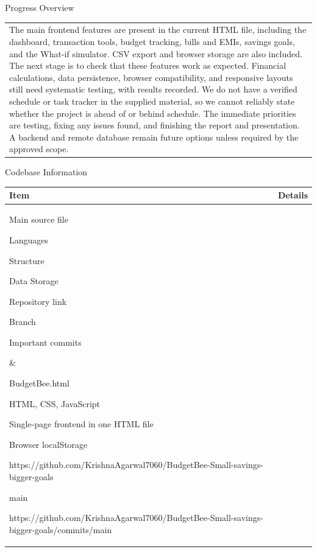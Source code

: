 \documentclass[12pt,a4paper]{article}
\newcommand{\sectiontitle}[1]{%
    {\color{GEUBlue}
    \fontsize{18}{22}\selectfont #1}
}
\newcommand{\answerbox}[2]{%
    \begin{tabularx}{\textwidth}{
        |>{\raggedright\arraybackslash}X|}
        \hline
        \parbox[t][#1][t]{\dimexpr\linewidth-12pt\relax}{
            \vspace{5pt}
            \fontsize{11}{13}\selectfont #2
        }\\
        \hline
    \end{tabularx}
}
\begin{document}
\vspace{1.75cm}

\sectiontitle{Progress Overview}

\vspace{0.25cm}

\answerbox{3.95cm}{The main frontend features are present in the current HTML file, including the dashboard, transaction tools, budget
tracking, bills and EMIs, savings goals, and the What-if simulator. CSV export and browser storage are also included. The
next stage is to check that these features work as expected. Financial calculations, data persistence, browser
compatibility, and responsive layouts still need systematic testing, with results recorded. We do not have a verified
schedule or task tracker in the supplied material, so we cannot reliably state whether the project is ahead of or behind
schedule. The immediate priorities are testing, fixing any issues found, and finishing the report and presentation. A
backend and remote database remain future options unless required by the approved scope.}

\vspace{1.75cm}

\sectiontitle{Codebase Information}

\vspace{0.20cm}

\begin{tabularx}{\textwidth}{
|>{\raggedright\arraybackslash}X
|>{\raggedright\arraybackslash}X|
}
\hline

\textbf{Item} &
\textbf{Details}
\\
\hline

\parbox[t][6.15cm][t]{\linewidth}{
\begin{compresslist}
    \item Main source file
    \item Languages
    \item Structure
    \item Data Storage 
    \item Repository link
    \vspace{0.50cm}
    \item Branch
    \item Important commits
\end{compresslist} 
}
&
\parbox[t][6.15cm][t]{\linewidth}{
\begin{compresslist}
    \item BudgetBee.html
    \item HTML, CSS, JavaScript
    \item Single-page frontend in one HTML file
    \item Browser localStorage
    \item https://github.com/KrishnaAgarwal7060/BudgetBee-Small-savings-bigger-goals
    \item main
    \item https://github.com/KrishnaAgarwal7060/BudgetBee-Small-savings-bigger-goals/commits/main
\end{compresslist} 
}
\\
\hline

\end{tabularx}
\end{document}
